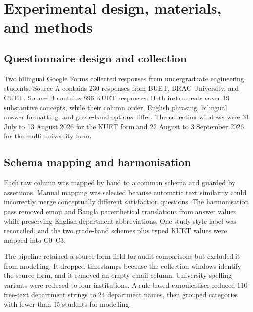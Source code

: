 \section{Experimental design, materials, and methods}
\subsection{Questionnaire design and collection}
Two bilingual Google Forms collected responses from undergraduate engineering students. Source A contains 230 responses from BUET, BRAC University, and CUET. Source B contains 896 KUET responses. Both instruments cover 19 substantive concepts, while their column order, English phrasing, bilingual answer formatting, and grade-band options differ. The collection windows were 31 July to 13 August 2026 for the KUET form and 22 August to 3 September 2026 for the multi-university form.

\subsection{Schema mapping and harmonisation}
Each raw column was mapped by hand to a common  schema and guarded by assertions. Manual mapping was selected because automatic text similarity could incorrectly merge conceptually different satisfaction questions. The harmonisation pass removed emoji and Bangla parenthetical translations from answer values while preserving English department abbreviations. One study-style label was reconciled, and the two grade-band schemes plus typed KUET values were mapped into C0--C3.

The pipeline retained a source-form field for audit comparisons but excluded it from modelling. It dropped timestamps because the collection windows identify the source form, and it removed an empty email column. University spelling variants were reduced to four institutions. A rule-based canonicaliser reduced 110 free-text department strings to 24 department names, then grouped categories with fewer than 15 students for modelling.

